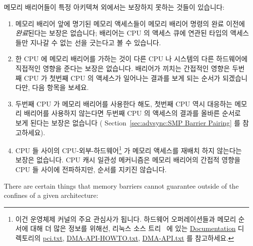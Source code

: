 \begin{enumerate}
메모리 배리어들이 특정 아키텍쳐 외에서는 보장하지 못하는 것들이 있습니다:

\begin{enumerate}
\item	메모리 배리어 앞에 명기된 메모리 액세스들이 메모리 배리어 명령의 완료
	이전에 \emph{완료}된다는 보장은 없습니다; 배리어는 CPU 의 액세스 큐에
	연관된 타입의 액세스들만 지나갈 수 없는 선을 긋는다고 볼 수 있습니다.
\item	한 CPU 에 메모리 배리어를 가하는 것이 다른 CPU 나 시스템의 다른
	하드웨어에 직접적인 영향을 준다는 보장은 없습니다.
	배리어가 끼치는 간접적인 영향은 두번째 CPU 가 첫번째 CPU 의 액세스가
	일어나는 결과를 보게 되는 순서가 되겠습니다만, 다음 항목을 보세요.
\item	두번째 CPU 가 메모리 배리어를 사용한다 해도, 첫번째 CPU 역시 대응하는
	메모리 배리어를 사용하지 않는다면 두번째 CPU 의 액세스의 결과를 올바른
	순서로 보게 된다는 보장은 없습니다 (
	Section~\ref{sec:advsync:SMP Barrier Pairing} 를 참고하세요).
\item	CPU 들 사이의 CPU-외부-하드웨어\footnote{
		이건 운영체제 커널의 주요 관심사가 됩니다.
		하드웨어 오퍼레이션들과 메모리 순서에 대해 더 많은 정보를
		위해선, 리눅스 소스 트리~\cite{Torvalds2.6kernel} 에 있는
		\url{Documentation} 디렉토리의 \url{pci.txt},
		\url{DMA-API-HOWTO.txt}, \url{DMA-API.txt} 를 참고하세요.}
	가 메모리 액세스를 재배치 하지 않는다는 보장은 없습니다.
	CPU 캐시 일관성 메커니즘은 메모리 배리어의 간접적 영향을 CPU 들 사이에
	전파하지만, 순서를 지키진 않습니다.
\end{enumerate}
\iffalse

There are certain things that memory barriers cannot guarantee outside
of the confines of a given architecture:


\end{enumerate}
